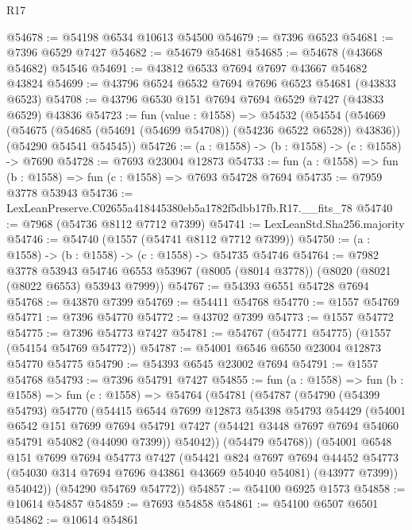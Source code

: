 \begin{lexlean}{R17}
\begin{coremodule}
@54678 := @54198 @6534 @10613 @54500
@54679 := @7396 @6523
@54681 := @7396 @6529 @7427
@54682 := @54679 @54681
@54685 := @54678 (@43668 @54682) @54546
@54691 := @43812 @6533 @7694 @7697 @43667 @54682 @43824
@54699 := @43796 @6524 @6532 @7694 @7696 @6523 @54681 (@43833 @6523)
@54708 := @43796 @6530 @151 @7694 @7694 @6529 @7427 (@43833 @6529) @43836
@54723 := fun (value : @1558) =>
  @54532
    (@54554
      (@54669 (@54675 (@54685 (@54691 (@54699 @54708)) (@54236 @6522 @6528)) @43836))
      (@54290 @54541 @54545))
@54726 := (a : @1558) -> (b : @1558) -> (c : @1558) -> @7690
@54728 := @7693 @23004 @12873
@54733 := fun (a : @1558) => fun (b : @1558) => fun (c : @1558) => @7693 @54728 @7694
@54735 := @7959 @3778 @53943
@54736 := LexLeanPreserve.C02655a418445380eb5a1782f5dbb17fb.R17.__fits_78
@54740 := @7968 (@54736 @8112 @7712 @7399)
@54741 := LexLeanStd.Sha256.majority
@54746 := @54740 (@1557 (@54741 @8112 @7712 @7399))
@54750 := (a : @1558) -> (b : @1558) -> (c : @1558) -> @54735 @54746
@54764 := @7982
    @3778
    @53943
    @54746
    @6553
    @53967
    (@8005 (@8014 @3778))
    (@8020 (@8021 (@8022 @6553) @53943 @7999))
@54767 := @54393 @6551 @54728 @7694
@54768 := @43870 @7399
@54769 := @54411 @54768
@54770 := @1557 @54769
@54771 := @7396 @54770
@54772 := @43702 @7399
@54773 := @1557 @54772
@54775 := @7396 @54773 @7427
@54781 := @54767 (@54771 @54775) (@1557 (@54154 @54769 @54772))
@54787 := @54001 @6546 @6550 @23004 @12873 @54770 @54775
@54790 := @54393 @6545 @23002 @7694
@54791 := @1557 @54768
@54793 := @7396 @54791 @7427
@54855 := fun (a : @1558) =>
  fun (b : @1558) =>
  fun (c : @1558) =>
  @54764
    (@54781
      (@54787
        (@54790
          (@54399 @54793)
          @54770
          (@54415
            @6544
            @7699
            @12873
            @54398
            @54793
            @54429
            (@54001
              @6542
              @151
              @7699
              @7694
              @54791
              @7427
              (@54421 @3448 @7697 @7694 @54060 @54791 @54082 (@44090 @7399))
              @54042))
          (@54479 @54768))
        (@54001
          @6548
          @151
          @7699
          @7694
          @54773
          @7427
          (@54421
            @824
            @7697
            @7694
            @44452
            @54773
            (@54030 @314 @7694 @7696 @43861 @43669 @54040 @54081)
            (@43977 @7399))
          @54042))
      (@54290 @54769 @54772))
@54857 := @54100 @6925 @1573
@54858 := @10614 @54857
@54859 := @7693 @54858
@54861 := @54100 @6507 @6501
@54862 := @10614 @54861

\end{coremodule}
\end{lexlean}
